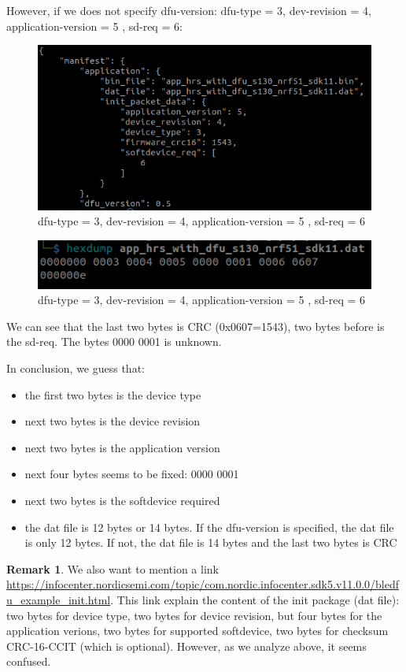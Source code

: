 \documentclass{article}
\theoremstyle{plain}
\theoremstyle{definition}
\newtheorem{remark}{Remark}
\numberwithin{equation}{section}
\begin{document}
However, if we does not specify dfu-version: dfu-type = 3, dev-revision = 4, application-version = 5 , sd-req = 6:
\begin{figure}[H]
	\centering
	\includegraphics[width=0.7\linewidth]{images/dfu_type3revision4app5sd-req6-manifest}
	\caption{dfu-type = 3, dev-revision = 4, application-version = 5 , sd-req = 6}
	\label{fig:dfutype3revision4app5sd-req6-manifest}
\end{figure}
\begin{figure}[H]
	\centering
	\includegraphics[width=0.7\linewidth]{images/dfu_type3revision4app5sd-req6-dat}
	\caption{dfu-type = 3, dev-revision = 4, application-version = 5 , sd-req = 6}
	\label{fig:dfutype3revision4app5sd-req6-dat}
\end{figure}
We can see that the last two bytes is CRC (0x0607=1543), two bytes before is the sd-req. The bytes 0000 0001 is unknown.

In conclusion, we guess that:
\begin{itemize}
	\item the first two bytes is the device type
	\item next two bytes is the device revision
	\item next two bytes is the application version
	\item next four bytes seems to be fixed: 0000 0001
	\item next two bytes is the softdevice required
	\item the dat file is 12 bytes or 14 bytes. If the dfu-version is specified, the dat file is only 12 bytes. If not, the dat file is 14 bytes and the last two bytes is CRC
\end{itemize}

\begin{remark}
	We also want to mention a link \url{https://infocenter.nordicsemi.com/topic/com.nordic.infocenter.sdk5.v11.0.0/bledfu_example_init.html}. This link explain the content of the init package (dat file): two bytes for device type, two bytes for device revision, but four bytes for the application verions, two bytes for supported softdevice, two bytes for checksum CRC-16-CCIT (which is optional). However, as we analyze above, it seems confused.
	
\end{remark}
\end{document}
